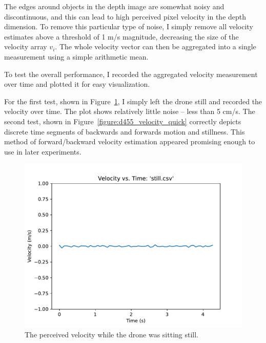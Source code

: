 The edges around objects in the depth image are somewhat noisy and discontinuous,
and this can lead to high perceived pixel velocity in the depth dimension.
To remove this particular type of noise, I simply remove all velocity estimates
above a threshold of 1 m/s magnitude, decreasing the size of the velocity array $v_i$.
The whole velocity vector can then be aggregated into a single measurement using a simple arithmetic mean.

To test the overall performance, I recorded the aggregated velocity measurement over time
and plotted it for easy visualization.

For the first test, shown in Figure~\ref{figure:d455_velocity_still},
I simply left the drone still and recorded the velocity over time.
The plot shows relatively little noise -- less than 5 cm/s.
The second test, shown in Figure~\ref{figure:d455_velocity_quick} correctly depicts
discrete time segments of backwards and forwards motion and stillness.
This method of forward/backward velocity estimation appeared promising enough to use in later experiments.

\begin{figure}
	\centering
	\includegraphics[width=\linewidth]{./images/still.pdf}
	\caption{The perceived velocity while the drone was sitting still.}
	\label{figure:d455_velocity_still}
\end{figure}

